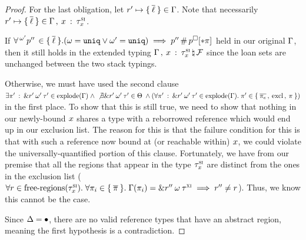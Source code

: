 \begin{proof}
  For the last obligation, let
  $r^\prime \mapsto \{ \: \overline{\ell} \: \} \in \Gamma$. Note that
  necessarily $r^\prime \mapsto \{ \: \overline{\ell} \: \} \in
  \Gamma \, , \: x \: : \: \tau^\textsc{si}_x$.

  If $\forall \,^{\omega^\prime}p^{\prime\prime}\, \in
  \{ \: \overline{\ell} \: \}. (\omega = \mathtt{uniq} \vee \omega^\prime = \mathtt{uniq})
  \implies p^{\prime\prime} \, \# \, 
    p^\square[* \pi] $ held in our original $\Gamma$,
  then it still holds in the extended typing $
    \Gamma \, , \: x \: : \: \tau^\textsc{si}_x  \, \natural \, \mathcal{F}$
  since the loan sets are unchanged between the two stack typings.

  Otherwise, we must have used the second clause $\exists
  \pi^\prime \: : \: \& r^\prime \: \omega^\prime \: \tau^\prime
  \in \textrm{explode}(\Gamma) \; \wedge \; \not \exists
  \& r^\prime \: \omega^\prime \: \tau^\prime \in \Theta \;
  \wedge (\forall
  \pi^\prime \: : \: \& r^\prime \: \omega^\prime \: \tau^\prime
  \in \textrm{explode}(\Gamma). \; \pi^\prime \in \{ \: 
    \overline{\pi_e} \, , \: \textrm{excl} \, , \: \pi  \: \})$ in the
  first place. To show that this is still true, we need to show that nothing in
  our newly-bound $x$ shares a type with a reborrowed reference which would
  end up in our exclusion list. The reason for this is that the failure
  condition for this is that with such a reference now bound at (or reachable
  within) $x$, we could violate the universally-quantified portion of this
  clause. Fortunately, we have from our premise that all the regions that
  appear in the type $\tau^\textsc{si}_x$ are distinct from the ones in the
  exclusion list ($\forall r \in \textrm{free-regions}(\tau^\textsc{si}_x). \; \forall
  \pi_i \in \{ \: \overline{\pi} \: \}. \; \Gamma(\pi_i) =
  \& r^{\prime\prime} \: \omega \: \tau^\textsc{xi} \implies
  r^{\prime\prime} \neq r$). Thus, we know this cannot be the
  case.

  \vspace{1em}
  \noindent \framebox[\textwidth]{ \figuresize
    \begin{mathpar}
      \ODerefAbs
    \end{mathpar}
  } \vspace{1em}

  Since $\Delta = \bullet$, there are no valid reference types that have
  an abstract region, meaning the first hypothesis is a contradiction.
\end{proof}

